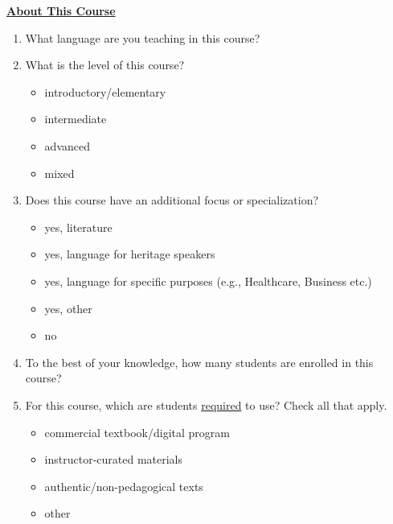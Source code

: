 \documentclass[letterpaper,10pt]{article}
\begin{document}
\noindent \underline{\textbf{About This Course}}
\begin{enumerate}
\item What language are you teaching in this course? \underline{\hspace{3.5in}}

\item What is the level of this course?
\vspace{-0.1in}\begin{multicols}{2}
\begin{itemize}
	\item introductory/elementary
	\item intermediate
	\item advanced
	\item mixed
\end{itemize}
\end{multicols}

\item Does this course have an additional focus or specialization?
\vspace{-0.1in}\begin{multicols}{2}
\begin{itemize}
	\item yes, literature
	\item yes, language for heritage speakers
	\item yes, language for specific purposes (e.g., Healthcare, Business etc.)
	\item yes, other \underline{\hspace{2in}}
	\item no
\end{itemize}
\end{multicols}

\item To the best of your knowledge, how many students are enrolled in this course? \underline{\hspace{1.5in}}

\item For this course, which are students \underline{required} to use? Check all that apply.
\vspace{-0.1in}\begin{multicols}{2}
\begin{itemize}
	\item commercial textbook/digital program
	\item instructor-curated materials
	\item authentic/non-pedagogical texts
	\item other \underline{\hspace{2in}}
\end{itemize}
\end{multicols}


\end{enumerate}
\end{document}
